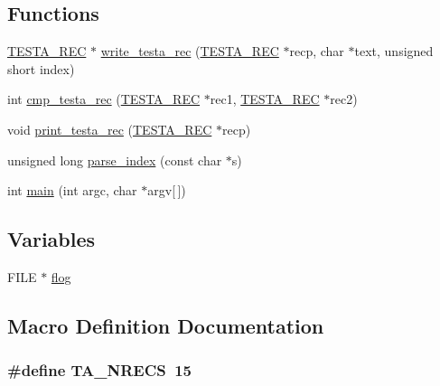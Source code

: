 \subsection*{Functions}
\begin{DoxyCompactItemize}
\item 
\hyperlink{test-memmapio_8c_a0b621230f367bbb7d4a28d320e5f732c}{T\-E\-S\-T\-A\-\_\-\-R\-E\-C} $\ast$ \hyperlink{test-memmapio_8c_a9d98f11a80e97da3ed866e43ea07e7dc}{write\-\_\-testa\-\_\-rec} (\hyperlink{test-memmapio_8c_a0b621230f367bbb7d4a28d320e5f732c}{T\-E\-S\-T\-A\-\_\-\-R\-E\-C} $\ast$recp, char $\ast$text, unsigned short index)
\item 
int \hyperlink{test-memmapio_8c_a57b9ceb9e9a3e3fedb1bfe4a3a52a50f}{cmp\-\_\-testa\-\_\-rec} (\hyperlink{test-memmapio_8c_a0b621230f367bbb7d4a28d320e5f732c}{T\-E\-S\-T\-A\-\_\-\-R\-E\-C} $\ast$rec1, \hyperlink{test-memmapio_8c_a0b621230f367bbb7d4a28d320e5f732c}{T\-E\-S\-T\-A\-\_\-\-R\-E\-C} $\ast$rec2)
\item 
void \hyperlink{test-memmapio_8c_af152e57a009033ccfe75316531a1240c}{print\-\_\-testa\-\_\-rec} (\hyperlink{test-memmapio_8c_a0b621230f367bbb7d4a28d320e5f732c}{T\-E\-S\-T\-A\-\_\-\-R\-E\-C} $\ast$recp)
\item 
unsigned long \hyperlink{test-memmapio_8c_aa84bf264d614031cb8637aa3dcf42910}{parse\-\_\-index} (const char $\ast$s)
\item 
int \hyperlink{test-memmapio_8c_a0ddf1224851353fc92bfbff6f499fa97}{main} (int argc, char $\ast$argv\mbox{[}$\,$\mbox{]})
\end{DoxyCompactItemize}
\subsection*{Variables}
\begin{DoxyCompactItemize}
\item 
F\-I\-L\-E $\ast$ \hyperlink{test-memmapio_8c_a124fb35b6a498a5b2a566cbc525af8d7}{flog}
\end{DoxyCompactItemize}


\subsection{Macro Definition Documentation}
\hypertarget{test-memmapio_8c_a1fe547121f209c18227664f5fc0c9ecc}{
\subsubsection[{T\-A\-\_\-\-N\-R\-E\-C\-S}]{\setlength{\rightskip}{0pt plus 5cm}\#define T\-A\-\_\-\-N\-R\-E\-C\-S~15}}\label{test-memmapio_8c_a1fe547121f209c18227664f5fc0c9ecc}


